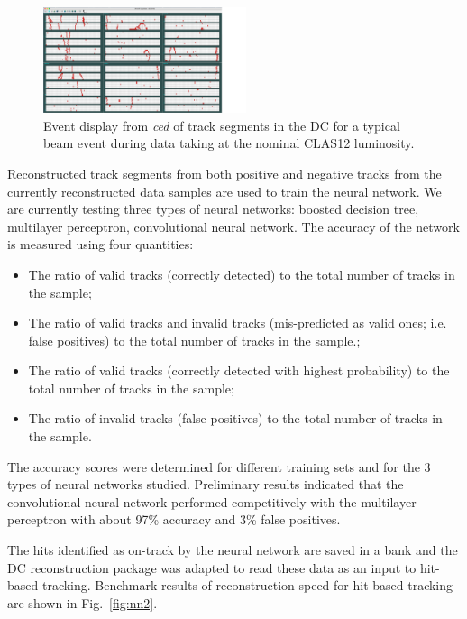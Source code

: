 \begin{figure}
\centering
\includegraphics[width=0.53\textwidth]{pics/nn1.png}
\caption{Event display from {\it ced} of track segments in the DC for a typical beam event during data taking
  at the nominal CLAS12 luminosity.}
\label{fig:nn1}
\end{figure}

Reconstructed track segments from both positive and negative tracks from the currently reconstructed data
samples are used to train the neural network. We are currently testing three types of neural networks: boosted
decision tree, multilayer perceptron, convolutional neural network. The accuracy of the network is measured using
four quantities:

\begin{itemize}
\item The ratio of valid tracks (correctly detected) to the total number of tracks in the sample;
\item The ratio of valid tracks and  invalid tracks (mis-predicted as valid ones; i.e. false positives) to the total
  number of tracks in the sample.;
\item The ratio of valid tracks (correctly detected with highest probability) to the total number of tracks in the
  sample;
\item The ratio of invalid tracks (false positives) to the total number of tracks in the sample.
\end{itemize}

The accuracy scores were determined for different training sets and for the 3 types of neural networks studied.
Preliminary results indicated that the convolutional neural network performed competitively with the multilayer
perceptron with about 97\% accuracy and 3\% false positives. 

The hits identified as on-track by the neural network are saved in a bank and the DC reconstruction package was
adapted to read these data as an input to hit-based tracking. Benchmark results of reconstruction speed for
hit-based tracking are shown in Fig.~\ref{fig:nn2}.

